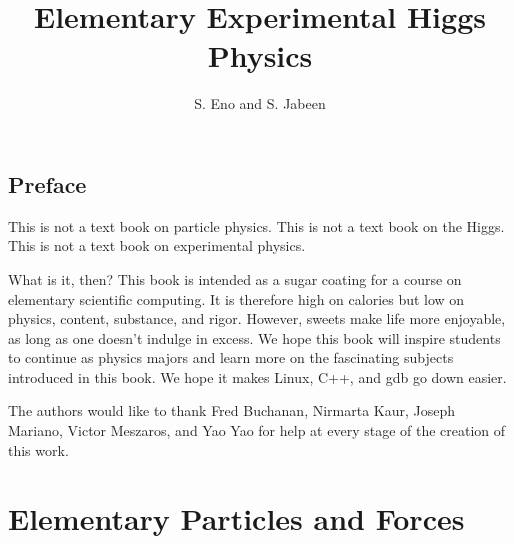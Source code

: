 \documentclass[11pt,fleqn]{book} %
\title{Elementary Experimental Higgs Physics}
\author{S. Eno and S. Jabeen}
\begin{document}
\maketitle
{}
\cftbeforetoctitleskip
\setlength{\cftbeforetoctitleskip}{1}
  \tableofcontents

\newpage
\section*{Preface}
This is not a text book on particle physics.  This is not a text book on the Higgs.  This is not a text book on experimental physics.


What is it, then?  This book is intended as a sugar coating for a course on elementary scientific computing.  It is therefore high on calories but low on
physics, content, substance, and rigor.  However, sweets make life more enjoyable, as long as one doesn't indulge in excess.  We hope this book will inspire students to continue as physics majors and learn more on the fascinating subjects introduced in this book.  We hope it makes Linux, C++, and gdb go down easier.


The authors would like to thank Fred Buchanan, Nirmarta Kaur, Joseph Mariano, Victor Meszaros, and Yao Yao for help at every stage of the creation of this work.




\pagestyle{fancy} %



\chapter{Elementary Particles and Forces}

\end{document}
